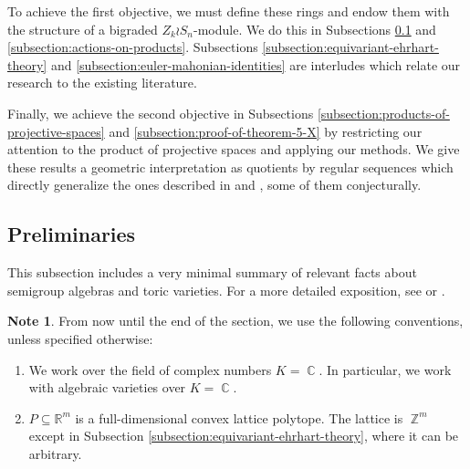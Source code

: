 \documentclass[a4paper,12pt]{amsart}
\theoremstyle{plain}
\theoremstyle{definition}
\newtheorem{note}[theorem]{Note}
\theoremstyle{remark}
\DeclareMathOperator{\ZZ}{\mathbb{Z}}
\DeclareMathOperator{\CC}{\mathbb{C}}
\begin{document}
To achieve the first objective, we must define these rings and endow them with the structure of a bigraded $Z_k \wr S_n$-module. We do this in Subsections \ref{subsection:semigroup-algebras-preliminaries} and \ref{subsection:actions-on-products}. Subsections \ref{subsection:equivariant-ehrhart-theory} and \ref{subsection:euler-mahonian-identities} are interludes which relate our research to the existing literature.

Finally, we achieve the second objective in Subsections \ref{subsection:products-of-projective-spaces} and \ref{subsection:proof-of-theorem-5-X} by restricting our attention to the product of projective spaces and applying our methods. We give these results a geometric interpretation as quotients by regular sequences which directly generalize the ones described in \cite{adeyemo-szendroi-refined} and \cite{braun-olsen-statistics}, some of them conjecturally.

\subsection{Preliminaries}\label{subsection:semigroup-algebras-preliminaries}
This subsection includes a very minimal summary of relevant facts about semigroup algebras and toric varieties. For a more detailed exposition, see \cite{miller-sturmfels-combinatorial} or \cite{cox-little-toric}.

\begin{note}
    From now until the end of the section, we use the following conventions, unless specified otherwise:
    \begin{enumerate}
        \item We work over the field of complex numbers $K = \CC$. In particular, we work with algebraic varieties over $K = \CC$.
        \item $P \subseteq \mathbb{R}^m$ is a full-dimensional convex lattice polytope. The lattice is $\ZZ^m$ except in Subsection \ref{subsection:equivariant-ehrhart-theory}, where it can be arbitrary.
    \end{enumerate}
\end{note}
\end{document}
